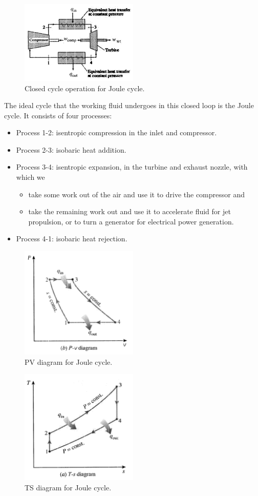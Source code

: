 \documentclass[class=report, crop=false, 12pt,a4paper]{standalone}
\begin{document}
\begin{figure}
  \centering
  \includegraphics[width = 0.5\textwidth]{../img/Brayton3}
  \caption{Closed cycle operation for Joule cycle.}
  \label{brayton3}
\end{figure}
The ideal cycle that the working fluid undergoes in this closed loop is the Joule cycle. It consists of four processes:
\begin{itemize}[noitemsep]
  \item Process 1-2: isentropic compression in the inlet and compressor.
  \item Process 2-3: isobaric heat addition.
  \item Process 3-4: isentropic expansion, in the turbine and exhaust nozzle, with which we
    \begin{itemize}[noitemsep]
      \item take some work out of the air and use it to drive the compressor and
      \item take the remaining work out and use it to accelerate fluid for jet propulsion, or to turn a generator for electrical power generation.
    \end{itemize}
  \item Process 4-1: isobaric heat rejection.
\end{itemize}
\begin{figure}
  \centering
  \includegraphics[width = 0.5\textwidth]{../img/BraytonPV}
  \caption{PV diagram for Joule cycle.}
\end{figure}
\begin{figure}
  \centering
  \includegraphics[width = 0.5\textwidth]{../img/BraytonTS}
  \caption{TS diagram for Joule cycle.}
\end{figure}
\end{document}
